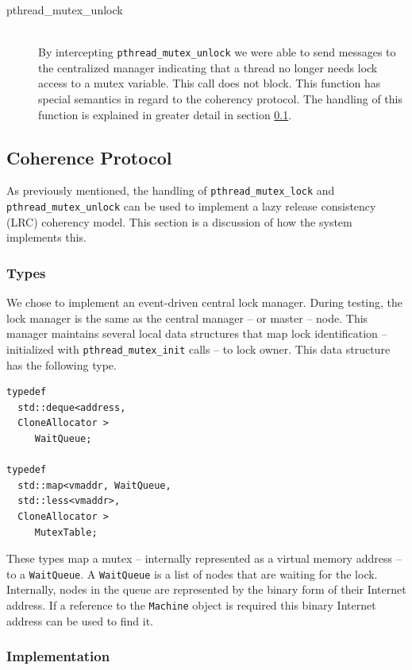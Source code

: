 \begin{description}
\item[pthread\_mutex\_unlock] \hfill \\
By intercepting \verb,pthread_mutex_unlock, we were able to send messages to the centralized manager indicating that a thread no longer needs lock access to a mutex variable.  This call does not block.  This function has special semantics in regard to the coherency protocol.   The handling of this function is explained in greater detail in section \ref{coherency-protocol}.
\end{description}

\subsection{Coherence Protocol}
\label{coherency-protocol}

As previously mentioned, the handling of \verb,pthread_mutex_lock, and \verb,pthread_mutex_unlock, can be used to implement a lazy release consistency (LRC) coherency model.  This section is a discussion of how the \projname{} system implements this.

\subsubsection{Types}
We chose to implement an event-driven central lock manager.  During testing, the lock manager is the same as the central manager -- or master -- node.  This manager maintains several local data structures that map lock identification -- initialized with \verb,pthread_mutex_init, calls -- to lock owner.  This data structure has the following type.

\begin{verbatim}
typedef
  std::deque<address,
  CloneAllocator >
     WaitQueue;

typedef
  std::map<vmaddr, WaitQueue,
  std::less<vmaddr>,
  CloneAllocator >
     MutexTable;
\end{verbatim}

These types map a mutex -- internally represented as a virtual memory address -- to a \verb,WaitQueue,.  A \verb,WaitQueue, is a list of nodes that are waiting for the lock.  Internally, nodes in the queue are represented by the binary form of their Internet address.  If a reference to the \verb,Machine, object is required this binary Internet address can be used to find it.

\subsubsection{Implementation}

